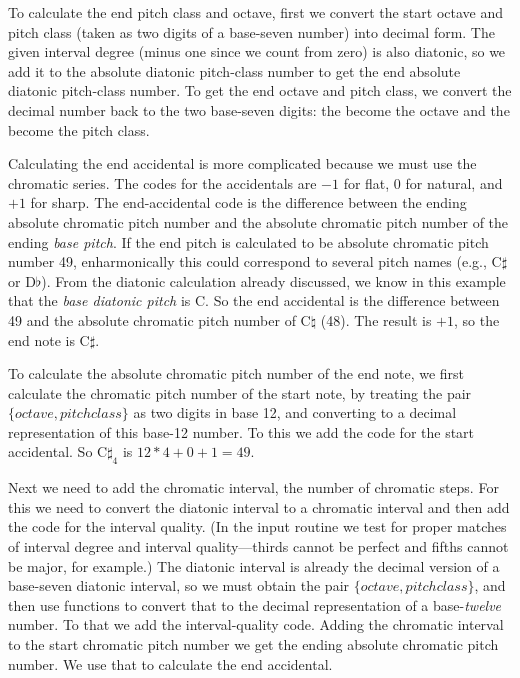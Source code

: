 To calculate the end pitch class and octave, first we convert the start octave
and pitch class (taken as two digits of a base-seven number) into decimal form.
The given interval degree (minus one since we count from zero) is also
diatonic,
so we add it to the absolute diatonic pitch-class number to get the end
absolute
diatonic pitch-class number.
To get the end octave and pitch class, we convert the decimal number back to
the
two base-seven digits: the  become the octave and the  become
the pitch class.

Calculating the end accidental is more complicated because we must use the
chromatic series.
The codes for the accidentals are $-1$ for flat, 0 for natural, and $+1$ for
sharp.
The end-accidental code is the difference between the ending absolute chromatic
pitch number and the absolute chromatic pitch number of the ending \emph{base
pitch}.
If the end pitch is calculated to be absolute chromatic pitch number 49,
enharmonically this could correspond to several pitch names (e.g., C$\sharp$
or D$\flat$).
From the diatonic calculation already discussed, we know in this example that
the \emph{base diatonic pitch} is C.
So the end accidental is the difference between 49 and the absolute chromatic
pitch number of C$\natural$ (48).
The result is $+1$, so the end note is C$\sharp$.

To calculate the absolute chromatic pitch number of the end note, we first
calculate the chromatic pitch number of the start note, by treating the pair
$\{octave, pitch class\}$ as two digits in base 12, and converting to a decimal
representation of this base-12 number.
To this we add the code for the start accidental.
So C$\sharp_4$ is $12 * 4 + 0 + 1 = 49$.

Next we need to add the chromatic interval, the number of chromatic steps.
For this we need to convert the diatonic interval to a chromatic interval and
then add the code for the interval quality.
(In the input routine we test for proper matches of interval degree and
interval
quality---thirds cannot be perfect and fifths cannot be major, for example.)
The diatonic interval is already the decimal version of a base-seven diatonic
interval, so we must obtain the pair $\{octave, pitch class\}$,
and then use functions to convert that to the decimal representation of a
base-\emph{twelve} number.
To that we add the interval-quality code.
Adding the chromatic interval to the start chromatic pitch number we get the
ending absolute chromatic pitch number.
We use that to calculate the end accidental.

